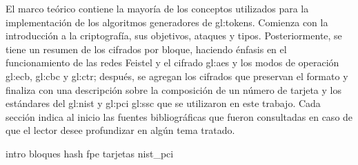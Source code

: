 %
%

%
%
El marco teórico contiene la mayoría de los conceptos utilizados para la
implementación de los algoritmos generadores de \glspl{gl:token}. Comienza con
la introducción a la criptografía, sus objetivos, ataques y tipos.
Posteriormente, se tiene un resumen de los cifrados por bloque, haciendo énfasis
en el funcionamiento de las redes Feistel y el cifrado \gls{gl:aes} y los modos
de operación \gls{gl:ecb}, \gls{gl:cbc} y \gls{gl:ctr}; después, se agregan los
cifrados que preservan el formato y finaliza con una descripción sobre la
composición de un número de tarjeta y los estándares del \gls{gl:nist} y
\gls{gl:pci} \gls{gl:ssc} que se utilizaron en este trabajo. Cada sección
indica al inicio las fuentes bibliográficas que fueron consultadas en caso de
que el lector desee profundizar en algún tema tratado.

{intro}
{bloques}
{hash}
{fpe}
{tarjetas}
{nist_pci}
